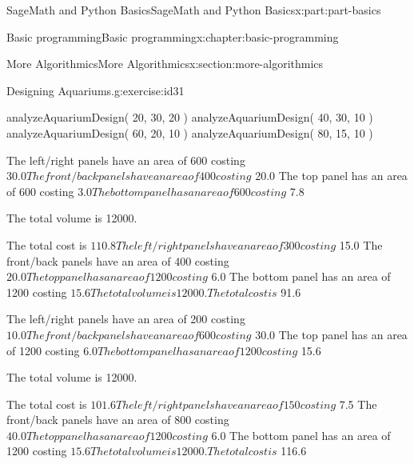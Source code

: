 \documentclass[oneside,10pt,]{book}
\numberwithin{equation}{section}
\begin{document}
\begin{partptx}{SageMath and Python Basics}{}{SageMath and Python Basics}{}{}{x:part:part-basics}
\begin{chapterptx}{Basic programming}{}{Basic programming}{}{}{x:chapter:basic-programming}
\begin{sectionptx}{More Algorithmics}{}{More Algorithmics}{}{}{x:section:more-algorithmics}
\begin{inlineexercise}{Designing Aquariums.}{g:exercise:id31}
\begin{sageinput}
analyzeAquariumDesign( 20, 30, 20 )
analyzeAquariumDesign( 40, 30, 10 )
analyzeAquariumDesign( 60, 20, 10 )
analyzeAquariumDesign( 80, 15, 10 )
\end{sageinput}
\begin{sageoutput}
The left/right panels have an area of 600 costing $ 30.0
The front/back panels have an area of 400 costing $ 20.0
The top panel has an area of 600 costing $ 3.0
The bottom panel has an area of 600 costing $ 7.8 

The total volume is 12000. 

The total cost is $ 110.8 

The left/right panels have an area of 300 costing $ 15.0
The front/back panels have an area of 400 costing $ 20.0
The top panel has an area of 1200 costing $ 6.0
The bottom panel has an area of 1200 costing $ 15.6 

The total volume is 12000. 

The total cost is $ 91.6 

The left/right panels have an area of 200 costing $ 10.0
The front/back panels have an area of 600 costing $ 30.0
The top panel has an area of 1200 costing $ 6.0
The bottom panel has an area of 1200 costing $ 15.6 

The total volume is 12000. 

The total cost is $ 101.6 

The left/right panels have an area of 150 costing $ 7.5
The front/back panels have an area of 800 costing $ 40.0
The top panel has an area of 1200 costing $ 6.0
The bottom panel has an area of 1200 costing $ 15.6 

The total volume is 12000. 

The total cost is $ 116.6
\end{sageoutput}
\end{inlineexercise}%
\end{sectionptx}
\end{chapterptx}
\end{partptx}
%
%
\typeout{************************************************}
\typeout{************************************************}
%
\end{document}

